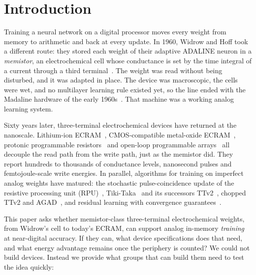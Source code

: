 \section{Introduction}\label{sec:intro}

Training a neural network on a digital processor moves every weight from memory to arithmetic and back at every update.
In 1960, Widrow and Hoff took a different route: they stored each weight of their adaptive ADALINE neuron in a
\emph{memistor}, an electrochemical cell whose conductance is set by the time integral of a current through a third
terminal~\cite{widrow1960adaline,widrow1960switching,widrow1990}. The weight was read without being disturbed, and it was
adapted in place. The device was macroscopic, the cells were wet, and no multilayer learning rule existed yet, so the line ended
with the Madaline hardware of the early 1960s~\cite{widrow1990}. That machine was a working analog learning system.

Sixty years later, three-terminal electrochemical devices have returned at the nanoscale. Lithium-ion
ECRAM~\cite{tang2018,fuller2017}, CMOS-compatible metal-oxide ECRAM~\cite{kim2019}, protonic programmable
resistors~\cite{onen2022,xu2026} and open-loop programmable arrays~\cite{chen2023} all decouple the read path from the write path,
just as the memistor did. They report hundreds to thousands of conductance levels, nanosecond pulses and femtojoule-scale write
energies. In parallel, algorithms for training on imperfect analog weights have matured: the stochastic pulse-coincidence update
of the resistive processing unit (RPU)~\cite{gokmen2016}, Tiki-Taka~\cite{gokmen2020} and its successors
TTv2~\cite{gokmen2021}, chopped TTv2 and AGAD~\cite{rasch2024}, and residual learning with convergence guarantees~\cite{wu2025}.

This paper asks whether memistor-class three-terminal electrochemical weights, from Widrow's cell to today's ECRAM, can support
analog in-memory \emph{training} at near-digital accuracy. If they can, what device specifications does that need, and what
energy advantage remains once the periphery is counted? We could not build devices. Instead we provide what groups that can
build them need to test the idea quickly:

